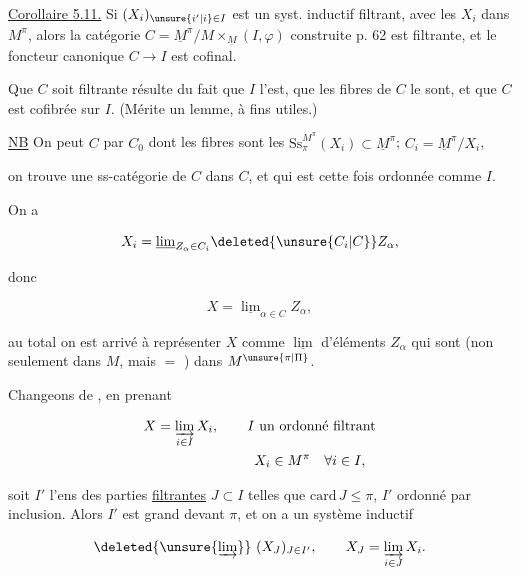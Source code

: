 \uline{Corollaire 5.11.} Si $(X_i)_{\unsure{i'|i}\in I}$ est un syst. inductif filtrant, avec les $X_i$ dans $M^\pi$, alors la catégorie $C=\underline M^\pi/M\times_{\underline{M}}(I,\varphi)$ construite p. 62 est filtrante, et le foncteur canonique  $C\longrightarrow I$ est cofinal.

 Que $C$ soit filtrante  résulte  du fait que $I$ l'est,  que les fibres de $C$ le sont, et que $C$ est cofibrée sur $I$. (Mérite un lemme, à  fins utiles.) 

 \uline{NB} On peut  $C$ par $C_0$ dont les fibres sont les $\mathrm{Ss}^{M^\pi}_{\pi}(X_i)\subset\underline M^{\pi}$;  $C_i=\underline M^\pi/X_i$,


on trouve une ss-catégorie de $C$  dans $C$, et qui est cette fois ordonnée  comme $I$.

On a

\[
X_i=\underline{\lim}_{Z_\alpha\in C_i}\deleted{\unsure{C_i|C}}Z_\alpha,
\]

 donc

\[
X=\underline{\lim}_{\alpha\in C}Z_\alpha,
\]

au total on est arrivé à représenter $X$ comme $\underline{\lim}$  d'éléments $Z_\alpha$ qui sont (non seulement dans $M$, mais $=$ ) dans $M^{\unsure{\pi|\Pi}}$.

Changeons de , en prenant

\[
\begin{aligned}
 X&=\varinjlim_{i\in I}X_i,\qquad I\ \text{un ordonné filtrant}\\
 &\hspace{5em}\qquad X_i\in M^\pi\quad\forall i\in I,
\end{aligned}
\]

soit $I'$ l'ens  des parties \uline{filtrantes} $J\subset I$ telles que $\mathrm{card}\,J\leq\pi$, $I'$ ordonné par inclusion. Alors $I'$ est grand devant $\pi$, et on a un système inductif

\[
\deleted{\unsure{\varinjlim}}\ (X_J)_{J\in I'},\qquad X_J=\varinjlim_{i\in J}X_i.
\]

